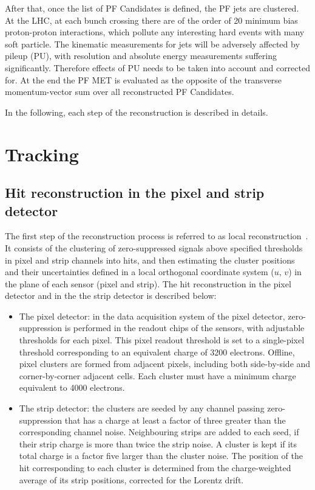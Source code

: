 After that, once the list of PF Candidates is defined, the PF jets are clustered. At the LHC,  at each bunch crossing there are of the order of 20 minimum bias proton-proton interactions, which pollute any interesting hard events with many soft particle. The kinematic measurements for jets will be adversely affected by pileup (PU), with resolution and absolute energy measurements
suffering significantly. Therefore effects of PU needs to be taken into account and corrected for. At the end the PF MET is evaluated as the opposite of the transverse momentum-vector sum over all reconstructed PF Candidates.

In the following, each step of the reconstruction is described in details. 

\section{Tracking}
\subsection*{Hit reconstruction in the pixel and strip detector}
The first step of the reconstruction process is referred to as local reconstruction~\cite{Chatrchyan:2014fea}.  It consists of the clustering of zero-suppressed
signals above specified thresholds in pixel and strip channels into hits,  and then estimating the cluster positions and their uncertainties defined in a local
orthogonal  coordinate  system ($u$, $v$) in  the  plane  of  each  sensor (pixel and strip). 
The  hit reconstruction in the pixel detector and in the the strip detector is described below:
\begin{itemize} 
\item The pixel detector: in the data acquisition system of the pixel detector, zero-suppression is performed in the
readout chips of the sensors, with adjustable thresholds for each pixel.  This pixel readout threshold 
is set to a single-pixel threshold corresponding to an equivalent charge of 3200
electrons.  Offline, pixel clusters are formed from adjacent pixels, including both side-by-side
and corner-by-corner adjacent cells.  Each cluster must have a minimum charge equivalent to
4000 electrons.
\item The strip detector:  the clusters are seeded by any channel passing zero-suppression that has a charge at least a
factor of three greater than the corresponding channel noise. Neighbouring strips are added
to each seed, if their strip charge is more than twice the strip noise. 
A cluster is kept if its total charge is a factor five larger than the cluster noise.
The position of the hit corresponding to each cluster is determined from the charge-weighted
average of its strip positions, corrected for the  Lorentz drift.
\end{itemize}

